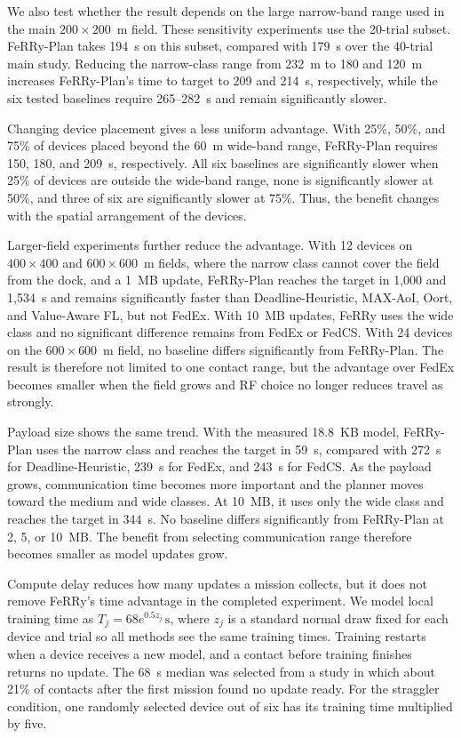 \documentclass[conference]{IEEEtran}
\newcommand{\sysname}{FeRRy}
\begin{document}
We also test whether the result depends on the large narrow-band range used in
the main \(200\times200\)~m field. These sensitivity experiments use the
20-trial subset. \sysname{}-Plan takes 194~s on this subset, compared with
179~s over the 40-trial main study. Reducing the narrow-class range from
232~m to 180 and 120~m increases \sysname{}-Plan's time to target to 209 and
214~s, respectively, while the six tested baselines require 265--282~s and
remain significantly slower.

Changing device placement gives a less uniform advantage. With 25\%, 50\%, and
75\% of devices placed beyond the 60~m wide-band range, \sysname{}-Plan
requires 150, 180, and 209~s, respectively. All six baselines are significantly
slower when 25\% of devices are outside the wide-band range, none is
significantly slower at 50\%, and three of six are significantly slower at
75\%. Thus, the benefit changes with the spatial arrangement of the devices.

Larger-field experiments further reduce the advantage. With 12 devices on
\(400\times400\) and \(600\times600\)~m fields, where the narrow class cannot
cover the field from the dock, and a 1~MB update, \sysname{}-Plan reaches the
target in 1,000 and 1,534~s and remains significantly faster than
Deadline-Heuristic, MAX-AoI, Oort, and Value-Aware FL, but not FedEx. With
10~MB updates, \sysname{} uses the wide class and no significant difference
remains from FedEx or FedCS. With 24 devices on the
\(600\times600\)~m field, no baseline differs significantly from
\sysname{}-Plan. The result is therefore not limited to one contact range, but
the advantage over FedEx becomes smaller when the field grows and RF choice no
longer reduces travel as strongly.

Payload size shows the same trend. With the measured 18.8~KB model,
\sysname{}-Plan uses the narrow class and reaches the target in 59~s, compared
with 272~s for Deadline-Heuristic, 239~s for FedEx, and 243~s for FedCS.
As the payload grows, communication time becomes more important and the planner
moves toward the medium and wide classes. At 10~MB, it uses only the wide class
and reaches the target in 344~s. No baseline differs significantly from
\sysname{}-Plan at 2, 5, or 10~MB. The benefit from selecting communication
range therefore becomes smaller as model updates grow.

Compute delay reduces how many updates a mission collects, but it does not
remove \sysname{}'s time advantage in the completed experiment. We model local
training time as
\(T_j=68e^{0.5z_j}\,\mathrm{s}\), where \(z_j\) is a standard normal draw
fixed for each device and trial so all methods see the same training times.
Training restarts when a device receives a new model, and a contact before
training finishes returns no update. The 68~s median was selected from a study
in which about 21\% of contacts after the first mission found no update ready.
For the straggler condition, one randomly selected device out of six has its
training time multiplied by five.
\end{document}
